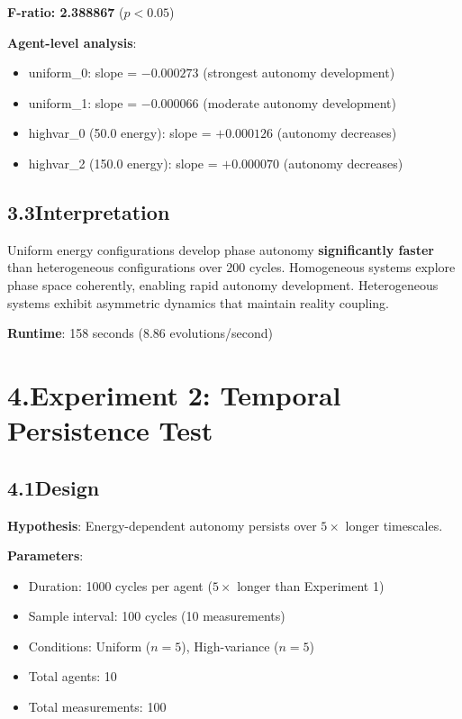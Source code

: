 \documentclass[11pt]{article}
\begin{document}
\noindent\textbf{F-ratio: 2.388867} ($p < 0.05$)

\noindent\textbf{Agent-level analysis}:
\begin{itemize}
    \item uniform\_0: slope = $-0.000273$ (strongest autonomy development)
    \item uniform\_1: slope = $-0.000066$ (moderate autonomy development)
    \item highvar\_0 (50.0 energy): slope = $+0.000126$ (autonomy decreases)
    \item highvar\_2 (150.0 energy): slope = $+0.000070$ (autonomy decreases)
\end{itemize}

\subsection*{3.3\quad Interpretation}

Uniform energy configurations develop phase autonomy \textbf{significantly faster} than heterogeneous configurations over 200 cycles. Homogeneous systems explore phase space coherently, enabling rapid autonomy development. Heterogeneous systems exhibit asymmetric dynamics that maintain reality coupling.

\noindent\textbf{Runtime}: 158 seconds (8.86 evolutions/second)

\section*{4.\quad Experiment 2: Temporal Persistence Test}

\subsection*{4.1\quad Design}

\noindent\textbf{Hypothesis}: Energy-dependent autonomy persists over $5\times$ longer timescales.

\noindent\textbf{Parameters}:
\begin{itemize}
    \item Duration: 1000 cycles per agent ($5\times$ longer than Experiment 1)
    \item Sample interval: 100 cycles (10 measurements)
    \item Conditions: Uniform ($n=5$), High-variance ($n=5$)
    \item Total agents: 10
    \item Total measurements: 100
\end{itemize}
\end{document}
